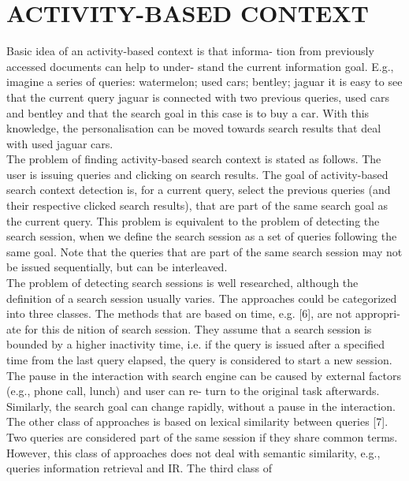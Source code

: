\documentclass{acm_proc_article-sp} %
\begin{document}
 \section{ACTIVITY-BASED CONTEXT}
 Basic idea of an activity-based context is that informa-
 tion from previously accessed documents can help to under-
 stand the current information goal. E.g., imagine a series of
 queries: watermelon; used cars; bentley; jaguar { it is easy
 	to see that the current query jaguar is connected with two
 	previous queries, used cars and bentley and that the search
 	goal in this case is to buy a car. With this knowledge, the
 	personalisation can be moved towards search results that
 	deal with used jaguar cars.
 	\\
 The problem of finding activity-based search context is
 stated as follows. The user is issuing queries and clicking
 on search results. The goal of activity-based search context
 detection is, for a current query, select the previous queries
 (and their respective clicked search results), that are part
 of the same search goal as the current query. This problem
 is equivalent to the problem of detecting the search session,
 when we define the search session as a set of queries following
 the same goal. Note that the queries that are part of the
 same search session may not be issued sequentially, but can
 be interleaved.
 \\
 The problem of detecting search sessions is well researched,
 although the definition of a search session usually varies.
 The approaches could be categorized into three classes. The
 methods that are based on time, e.g. [6], are not appropri-
 ate for this denition of search session. They assume that a
 search session is bounded by a higher inactivity time, i.e. if
 the query is issued after a specified time from the last query
 elapsed, the query is considered to start a new session. The
 pause in the interaction with search engine can be caused
 by external factors (e.g., phone call, lunch) and user can re-
 turn to the original task afterwards. Similarly, the search
 goal can change rapidly, without a pause in the interaction.
 The other class of approaches is based on lexical similarity
 between queries [7]. Two queries are considered part of the
 same session if they share common terms. However, this
 class of approaches does not deal with semantic similarity,
 e.g., queries information retrieval and IR. The third class of
}
\end{document}
